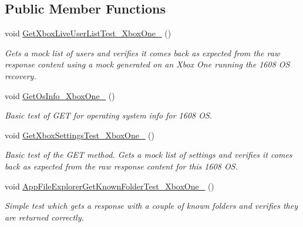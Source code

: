 \subsection*{Public Member Functions}
\begin{DoxyCompactItemize}
\item 
void \hyperlink{class_microsoft_1_1_tools_1_1_windows_device_portal_1_1_tests_1_1_xbox_one__14385__1002__amd64frd9599e6105747a2dd5ce5cbe798a705b_acd5f4eac4113b2a1c96139e41604037a}{Get\+Xbox\+Live\+User\+List\+Test\+\_\+\+Xbox\+One\+\_} ()
\begin{DoxyCompactList}\small\item\em Gets a mock list of users and verifies it comes back as expected from the raw response content using a mock generated on an Xbox One running the 1608 OS recovery. \end{DoxyCompactList}\item 
void \hyperlink{class_microsoft_1_1_tools_1_1_windows_device_portal_1_1_tests_1_1_xbox_one__14385__1002__amd64frd9599e6105747a2dd5ce5cbe798a705b_a9aeeb2ce83d20715cdd84f454e7b4e8d}{Get\+Os\+Info\+\_\+\+Xbox\+One\+\_} ()
\begin{DoxyCompactList}\small\item\em Basic test of G\+ET for operating system info for 1608 OS. \end{DoxyCompactList}\item 
void \hyperlink{class_microsoft_1_1_tools_1_1_windows_device_portal_1_1_tests_1_1_xbox_one__14385__1002__amd64frd9599e6105747a2dd5ce5cbe798a705b_a755586f05b86b17cfbb0581bc1f3e344}{Get\+Xbox\+Settings\+Test\+\_\+\+Xbox\+One\+\_} ()
\begin{DoxyCompactList}\small\item\em Basic test of the G\+ET method. Gets a mock list of settings and verifies it comes back as expected from the raw response content for this 1608 OS. \end{DoxyCompactList}\item 
void \hyperlink{class_microsoft_1_1_tools_1_1_windows_device_portal_1_1_tests_1_1_xbox_one__14385__1002__amd64frd9599e6105747a2dd5ce5cbe798a705b_a226749188548b7538fb7dfbab7d19e7c}{App\+File\+Explorer\+Get\+Known\+Folder\+Test\+\_\+\+Xbox\+One\+\_} ()
\begin{DoxyCompactList}\small\item\em Simple test which gets a response with a couple of known folders and verifies they are returned correctly. \end{DoxyCompactList}\item 

\end{DoxyCompactItemize}
